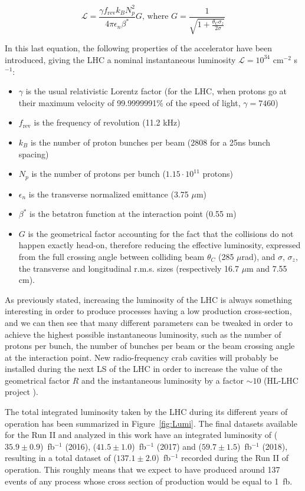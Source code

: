 \documentclass[a4paper, 10pt, openright]{report}
\begin{document}
\begin{equation}
\label{eq:Luminosity}
\mathcal{L} = \frac{\gamma f_{\text{rev}} k_B N_p^2}{4 \pi \epsilon_n \beta^*}G \text{,  where } G = \frac{1}{\sqrt{1+\frac{\theta_C \sigma_z}{2 \sigma}}}
\end{equation}

In this last equation, the following properties of the accelerator have been introduced, giving the \ac{LHC} a nominal instantaneous luminosity $\mathcal{L} = 10^{34}$ cm$^{-2}$ s$^{-1}$:
\begin{itemize}
\item $\gamma$ is the usual relativistic Lorentz factor (for the \ac{LHC}, when protons go at their maximum velocity of 99.9999991\% of the speed of light, $\gamma = 7460$)
\item $f_{\text{rev}}$ is the frequency of revolution (11.2 kHz)
\item $k_B$ is the number of proton bunches per beam (2808 for a 25ns bunch spacing)
\item $N_p$ is the number of protons per bunch ($1.15 \cdot 10^{11}$ protons)
\item $\epsilon_n$ is the transverse normalized emittance (3.75 $\mu$m)
\item $\beta^*$ is the betatron function at the interaction point (0.55 m)
\item $G$ is the geometrical factor accounting for the fact that the collisions do not happen exactly head-on, therefore reducing the effective luminosity, expressed from the full crossing angle between colliding beam $\theta_C$ (285 $\mu$rad), and $\sigma$, $\sigma_z$, the transverse and longitudinal r.m.s. sizes (respectively 16.7 $\mu$m and 7.55 cm).
\end{itemize}

As previously stated, increasing the luminosity of the \ac{LHC} is always something interesting in order to produce processes having a low production cross-section, and we can then see that many different parameters can be tweaked in order to achieve the highest possible instantaneous luminosity, such as the number of protons per bunch, the number of bunches per beam or the beam crossing angle at the interaction point. New radio-frequency crab cavities will probably be installed during the next \ac{LS} of the \ac{LHC} in order to increase the value of the geometrical factor $R$ and the instantaneous luminosity by a factor $\sim 10$ (HL-LHC project \cite{HLLHC}).

The total integrated luminosity taken by the \ac{LHC} during its different years of operation has been summarized in Figure~\ref{fig:Lumi}. The final datasets available for the Run II and analyzed in this work have an integrated luminosity of ($35.9 \pm 0.9$)~fb$^{-1}$ (2016), ($41.5 \pm 1.0$)~fb$^{-1}$ (2017) and ($59.7 \pm 1.5$)~fb$^{-1}$ (2018), resulting in a total dataset of ($137.1 \pm 2.0$)~fb$^{-1}$ recorded during the Run II of operation. This roughly means that we expect to have produced around 137 events of any process whose cross section of production would be equal to 1~fb.
\end{document}

